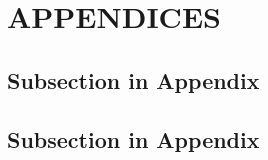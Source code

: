%
%
\section*{\MakeUppercase{Appendices}}

\subsection*{Subsection in Appendix}
\subsection*{Subsection in Appendix}
